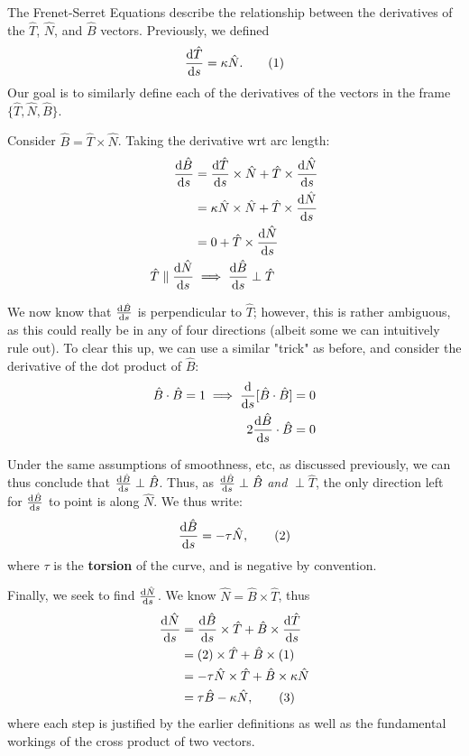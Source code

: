 \documentclass[12pt]{article}
\begin{document}
{The Frenet-Serret Equations describe the relationship between the derivatives of the $\hat{T}$, $\hat{N}$, and $\hat{B}$ vectors. Previously, we defined \[\frac{\text{d}\hat{T}}{\text{d}s} = \kappa \hat{N}. \qquad (1)\] Our goal is to similarly define each of the derivatives of the vectors in the frame $\{\hat{T}, \hat{N}, \hat{B}\}$.

Consider $\hat{B} = \hat{T} \times \hat{N}$. Taking the derivative wrt arc length: \begin{align*}\frac{\text{d}\hat{B}}{\text{d}s} &= \frac{\text{d}\hat{T}}{\text{d}s} \times \hat{N} + \hat{T} \times \frac{\text{d}\hat{N}}{\text{d}s}\\
    &= \kappa \hat{N} \times \hat{N} + \hat{T} \times \frac{\text{d}\hat{N}}{\text{d}s}\\
    &= 0 + \hat{T} \times \frac{\text{d}\hat{N}}{\text{d}s}\\
    \hat{T} \parallel \frac{\text{d}\hat{N}}{\text{d}s} &\implies \frac{\text{d}\hat{B}}{\text{d}s} \perp \hat{T}
\end{align*}

We now know that $\frac{\text{d}\hat{B}}{\text{d}s}$ is perpendicular to $\hat{T}$; however, this is rather ambiguous, as this could really be in any of four directions (albeit some we can intuitively rule out). To clear this up, we can use a similar "trick" as before, and consider the derivative of the dot product of $\hat{B}$: \begin{align*}
    \hat{B} \cdot \hat{B} = 1 \implies \frac{\text{d}}{\text{d}s}[\hat{B} \cdot \hat{B}] &= 0\\
    2 \frac{\text{d}\hat{B}}{\text{d}s}\cdot \hat{B} &= 0\\
\end{align*}

Under the same assumptions of smoothness, etc, as discussed previously, we can thus conclude that $\frac{\text{d}\hat{B}}{\text{d}s} \perp \hat{B}$. Thus, as $\frac{\text{d}\hat{B}}{\text{d}s} \perp \hat{B}$ \textit{and} $\perp \hat{T}$, the only direction left for $\frac{\text{d}\hat{B}}{\text{d}s}$ to point is along $\hat{N}$. We thus write: \[\frac{\text{d}\hat{B}}{\text{d}s} = -\tau \hat{N},\qquad (2)\] where $\tau$ is the \textbf{torsion} of the curve, and is negative by convention.

Finally, we seek to find $\frac{\text{d}\hat{N}}{\text{d}s}$. We know $\hat{N} = \hat{B} \times \hat{T}$, thus \begin{align*}
    \frac{\text{d}\hat{N}}{\text{d}s} &= \frac{\text{d}\hat{B}}{\text{d}s}\times\hat{T} + \hat{B}\times \frac{\text{d}\hat{T}}{\text{d}s}\\
    &= (2) \times \hat{T} + \hat{B} \times (1)\\
    &= -\tau \hat{N} \times \hat{T} + \hat{B} \times \kappa \hat{N}\\
    &= \tau \hat{B} - \kappa \hat{N}, \qquad (3)\\
\end{align*}
where each step is justified by the earlier definitions as well as the fundamental workings of the cross product of two vectors.

}
\end{document}

